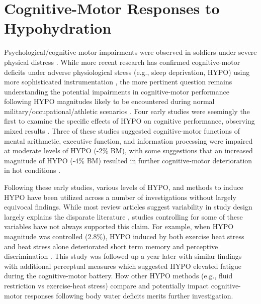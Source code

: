 \section{Cognitive-Motor Responses to Hypohydration}
Psychological/cognitive-motor impairments were observed in soldiers under severe physical distress \cite{adolf_physiology_1947,king_brief_1878}. While more recent research has confirmed cognitive-motor deficits under adverse physiological stress (e.g., sleep deprivation, HYPO) using more sophisticated instrumentation \cite{lieberman_severe_2005}, the more pertinent question remains understanding the potential impairments in cognitive-motor performance following HYPO magnitudes likely to be encountered during normal military/occupational/athletic scenarios \cite{sawka_american_2007}. Four early studies were seemingly the first to examine the specific effects of HYPO on cognitive performance, observing mixed results \cite{bijlani_effect_1980,sharma_differential_1983,sharma_influence_1986,gopinathan_role_1988}. Three of these studies suggested cognitive-motor functions of mental arithmetic, executive function, and information processing were impaired at moderate levels of HYPO (-2\% BM), with some suggestions that an increased magnitude of HYPO (-4\% BM) resulted in further cognitive-motor deterioration \cite{gopinathan_role_1988} in hot conditions \cite{sharma_differential_1983,sharma_influence_1986}.    

Following these early studies, various levels of HYPO, and methods to induce HYPO have been utilized across a number of investigations without largely equivocal findings. While most review articles suggest variability in study design largely explains the disparate literature \cite{masento_effects_2014,grandjean_dehydration_2007}, studies controlling for some of these variables have not always supported this claim. For example, when HYPO magnitude was controlled (2.8\%), HYPO induced by both exercise heat stress and heat stress alone deteriorated short term memory and perceptive discrimination \cite{cian_influence_2000}. This study was followed up a year later \cite{cian_effects_2001} with similar findings with additional perceptual measures which suggested HYPO elevated fatigue during the cognitive-motor battery. How other HYPO methods (e.g., fluid restriction vs exercise-heat stress) compare and potentially impact cognitive-motor responses following body water deficits merits further investigation.


